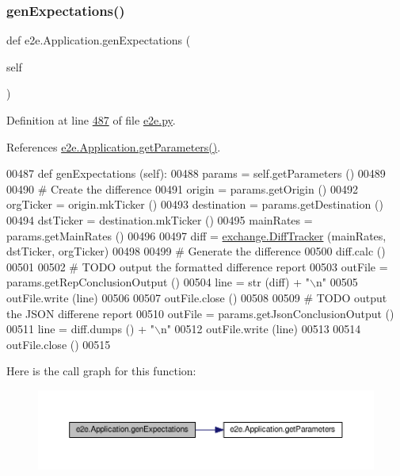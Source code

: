 \subsubsection{\texorpdfstring{gen\+Expectations()}{genExpectations()}}
{\footnotesize\ttfamily def e2e.\+Application.\+gen\+Expectations (\begin{DoxyParamCaption}\item[{}]{self }\end{DoxyParamCaption})}



Definition at line \hyperlink{e2e_8py_source_l00487}{487} of file \hyperlink{e2e_8py_source}{e2e.\+py}.



References \hyperlink{e2e_8py_source_l00386}{e2e.\+Application.\+get\+Parameters()}.


\begin{DoxyCode}
00487     \textcolor{keyword}{def }genExpectations (self):
00488         params = self.getParameters ()
00489 
00490         \textcolor{comment}{# Create the difference}
00491         origin      = params.getOrigin ()
00492         orgTicker   = origin.mkTicker ()
00493         destination = params.getDestination ()
00494         dstTicker   = destination.mkTicker ()
00495         mainRates   = params.getMainRates ()
00496         
00497         diff = \hyperlink{classexchange_1_1_diff_tracker}{exchange.DiffTracker} (mainRates, dstTicker, orgTicker)
00498        
00499         \textcolor{comment}{# Generate the difference}
00500         diff.calc ()
00501         
00502         \textcolor{comment}{# TODO output the formatted difference report}
00503         outFile = params.getRepConclusionOutput ()
00504         line = str (diff) + \textcolor{stringliteral}{"\(\backslash\)n"}
00505         outFile.write (line)
00506         
00507         outFile.close ()
00508         
00509         \textcolor{comment}{# TODO output the JSON differene report}
00510         outFile = params.getJsonConclusionOutput ()
00511         line = diff.dumps () + \textcolor{stringliteral}{"\(\backslash\)n"}
00512         outFile.write (line)
00513         
00514         outFile.close ()
00515             
\end{DoxyCode}
Here is the call graph for this function\+:
\nopagebreak
\begin{figure}[H]
\begin{center}
\leavevmode
\includegraphics[width=350pt]{classe2e_1_1_application_a72b854da6d69dbcb5031f24dccf9cc71_cgraph}
\end{center}
\end{figure}
\mbox{\label{classe2e_1_1_application_a0f753699fabab3ae17407b36404d3b64}} 
